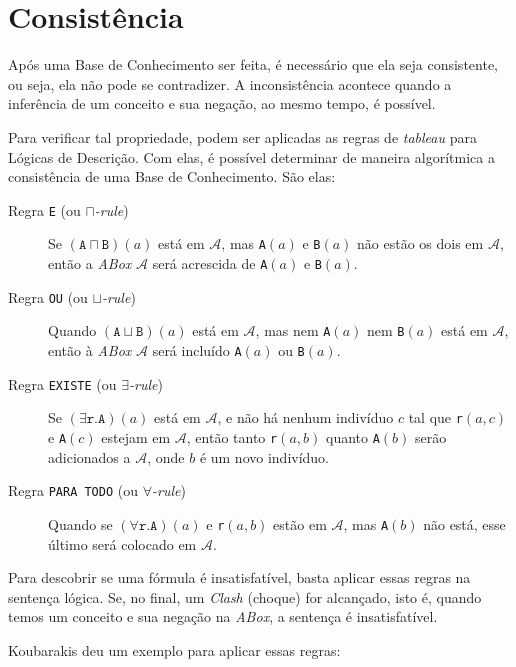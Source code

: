 \section{Consistência}

Após uma Base de Conhecimento ser feita, é necessário que ela seja consistente, ou seja, ela não pode se contradizer. A inconsistência acontece quando a inferência de um conceito e sua negação, ao mesmo tempo, é possível. 

Para verificar tal propriedade, podem ser aplicadas as regras de \textit{tableau} para Lógicas de Descrição. Com elas, é possível determinar de maneira algorítmica a consistência de uma Base de Conhecimento. São elas:

\begin{description}
	\item[Regra \texttt{E} (ou \textit{$ \sqcap $-rule})] Se $(\texttt{A} \sqcap \texttt{B})(a)$ está em $ \mathcal{A} $, mas \texttt{A}$ (a) $ e \texttt{B}$ (a) $ não estão os dois em $ \mathcal{A} $, então a \textit{ABox} $ \mathcal{A} $ será acrescida de \texttt{A}$ (a) $ e \texttt{B}$ (a) $.
	\item[Regra \texttt{OU} (ou \textit{$ \sqcup $-rule})] Quando $(\texttt{A} \sqcup \texttt{B})(a)$ está em $ \mathcal{A} $, mas nem \texttt{A}$ (a) $ nem \texttt{B}$ (a) $ está em $ \mathcal{A} $, então à \textit{ABox} $ \mathcal{A} $ será incluído \texttt{A}$ (a) $ ou \texttt{B}$ (a) $.
	\item[Regra \texttt{EXISTE} (ou \textit{$ \exists $-rule})] Se $(\exists \texttt{r.A})(a)$ está em $ \mathcal{A} $, e não há nenhum indivíduo $ c $ tal que \texttt{r}$ (a,c) $ e \texttt{A}$ (c) $ estejam em $ \mathcal{A} $, então tanto \texttt{r}$ (a,b) $ quanto \texttt{A}$ (b) $ serão adicionados a $ \mathcal{A} $, onde $ b $ é um novo indivíduo.
	\item[Regra \texttt{PARA TODO} (ou \textit{$ \forall $-rule})] Quando se $(\forall \texttt{r.A})(a)$ e \texttt{r}$ (a,b) $ estão em $ \mathcal{A} $, mas \texttt{A}$ (b) $ não está, esse último será colocado em $ \mathcal{A} $.  
\end{description}

Para descobrir se uma fórmula é insatisfatível, basta aplicar essas regras na sentença lógica. Se, no final, um \textit{Clash} (choque) for alcançado, isto é, quando temos um conceito e sua negação na \textit{ABox}, a sentença é insatisfatível.

Koubarakis \cite{logicaKoubarakis} deu um exemplo para aplicar essas regras:

